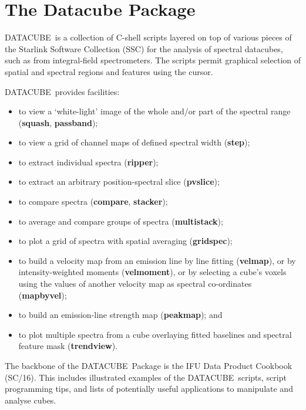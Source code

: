 \documentclass[twoside,11pt]{article}
\newcommand{\htmlref}[2]{#1}
\newcommand{\xref}[3]{#1}
\newcommand{\xlabel}[1]{}
\renewcommand{\_}{\texttt{\symbol{95}}}
\newcommand{\DATACUBE}{{\footnotesize DATACUBE}\normalsize}
\begin{document}
\section{\xlabel{sun237_intro}The Datacube Package\label{sun237_intro}}

DATACUBE\ is a collection of C-shell scripts layered on top of various
pieces of the Starlink Software Collection (SSC) for the analysis of
spectral datacubes, such as from integral-field spectrometers.  The
scripts permit graphical selection of spatial and spectral regions and
features using the cursor.

\DATACUBE\ provides facilities:
\begin{itemize}
\item to view a `white-light' image of the whole and/or part of the
      spectral range (\htmlref{{\bf squash}}{squash},
      \htmlref{{\bf passband}}{passband});
\item to view a grid of channel maps of defined spectral width
      (\htmlref{{\bf step}}{step});
\item to extract individual spectra (\htmlref{{\bf ripper}}{ripper});
\item to extract an arbitrary position-spectral slice
      (\htmlref{{\bf pvslice}}{pvslice});
\item to compare spectra (\htmlref{{\bf compare}}{compare},
      \htmlref{{\bf stacker}}{stacker});
\item to average and compare groups of spectra
      (\htmlref{{\bf multistack}}{multistack});
\item to plot a grid of spectra with spatial averaging
      (\htmlref{{\bf gridspec}}{gridspec});
\item to build a velocity map from an emission line by line
      fitting (\htmlref{{\bf velmap}}{velmap}), or by intensity-weighted
      moments (\htmlref{{\bf velmoment}}{velmoment}), or by selecting
      a cube's voxels using the values of another velocity map
      as spectral co-ordinates (\htmlref{{\bf mapbyvel}}{mapbyvel});
\item to build an emission-line strength map
      (\htmlref{{\bf peakmap}}{peakmap}); and
\item to plot multiple spectra from a cube overlaying fitted baselines
      and spectral feature mask (\htmlref{{\bf trendview}}{trendview}).
\end{itemize}

The backbone of the \DATACUBE\ Package is the \xref{IFU Data Product
Cookbook}{sc16}{} (SC/16).  This includes illustrated examples of the
\DATACUBE\ scripts, script programming tips, and lists of potentially
useful applications to manipulate and analyse cubes.
\end{document}

